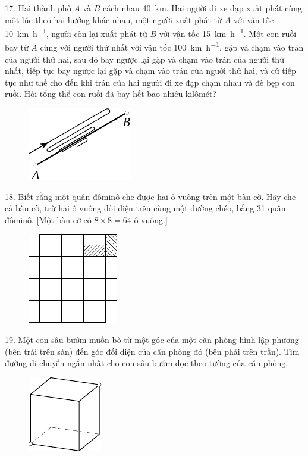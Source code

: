 \begin{problem}{17.}
	Hai thành phố $A$ và $B$ cách nhau \SI{40}{\km}. Hai người đi xe đạp xuất phát cùng một lúc theo hai hướng khác nhau, một người xuất phát từ $A$ với vận tốc \SI{10}{\km\per\hour}, người còn lại xuất phát từ $B$ với vận tốc \SI{15}{\km\per\hour}. Một con ruồi bay từ $A$ cùng với người thứ nhất với vận tốc \SI{100}{\km\per\hour}, gặp và chạm vào trán của người thứ hai, sau đó bay ngược lại gặp và chạm vào trán của người thứ nhất, tiếp tục bay ngược lại gặp và chạm vào trán của người thứ hai, và cứ tiếp tục như thế cho đến khi trán của hai người đi xe đạp chạm nhau và đè bẹp con ruồi. Hỏi tổng thể con ruồi đã bay hết bao nhiêu kilômét?
	\begin{figure}
		\includegraphics{resources/taskbook-1}
	\end{figure}
\end{problem}

\begin{problem}{18.}
	Biết rằng một quân đôminô che được hai ô vuông trên một bàn cờ. Hãy che cả bàn cờ, trừ hai ô vuông đối diện trên cùng một đường chéo, bằng 31 quân đôminô. [Một bàn cờ có $8\times 8 = 64$ ô vuông.]
	\begin{figure}
		\includegraphics{resources/taskbook-2}
	\end{figure}
\end{problem}

\begin{problem}{19.}
	Một con sâu bướm muốn bò từ một góc của một căn phòng hình lập phương (bên trái trên sàn) đến góc đối diện của căn phòng đó (bên phải trên trần). Tìm đường di chuyển ngắn nhất cho con sâu bướm dọc theo tường của căn phòng.

	\begin{figure}
		\includegraphics{resources/taskbook-3}
	\end{figure}
\end{problem}


